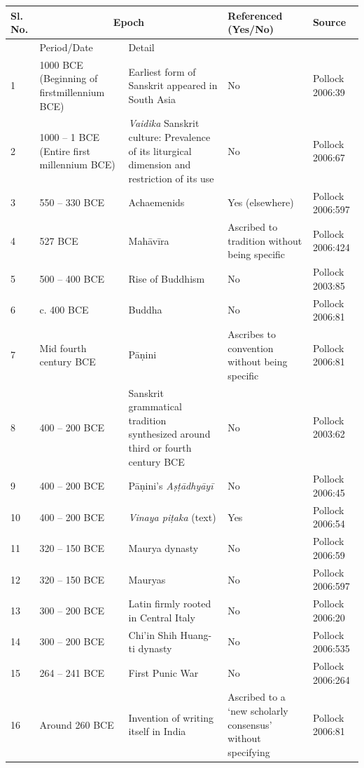 \begin{longtable}{|l|p{1.9cm}|p{1.9cm}|p{1.6cm}|p{1.6cm}|}
\hline
Sl. No. & \multicolumn{2}{c|}{Epoch} & Referenced (Yes/No) & Source \\
\hline
 & Period/Date & Detail &  &  \\
\hline
1 & 1000 BCE (Beginning of first\break millennium BCE) & Earliest form of Sanskrit appeared in South Asia & No & Pollock 2006:39 \\
\hline
2 & 1000 – 1 BCE (Entire first millennium BCE) & \textit{Vaidika} Sanskrit culture: Prevalence of its liturgical dimension and restriction of its use & No & Pollock 2006:67 \\
\hline
3 & 550 – 330 BCE & Achaemenids\index{Achaemenids} & Yes (elsewhere) & Pollock 2006:597 \\
\hline
4 & 527 BCE & Mahāvīra\index{Mahavira@Mahāvīra} & Ascribed to tradi\break tion without being specific & Pollock 2006:424 \\
\hline
5 & 500 – 400 BCE & Rise of Buddhism\index{Buddhism} & No & Pollock\index{Pollock, Sheldon} 2003:85 \\
\hline
6 & c. 400 BCE & Buddha\index{Buddha, the} & No & Pollock 2006:81 \\
\hline
7 & Mid fourth century BCE & Pāṇini\index{Panini@Pāṇini} & Ascribes to conven\break tion without being specific & Pollock 2006:81 \\
\hline
8 & 400 – 200 BCE & Sanskrit grammatical tradition synthesized around third or fourth century BCE & No & Pollock 2003:62 \\
\hline
9 & 400 – 200 BCE & Pāṇini’s \textit{Aṣṭādhyāyī}\index{Astadhyayi@\textit{Aṣṭādhyāyī}} & No & Pollock 2006:45 \\
\hline
10 & 400 – 200 BCE & \textit{Vinaya piṭaka} (text) & Yes & Pollock 2006:54 \\
\hline
11 & 320 – 150 BCE & Maurya dynasty & No & Pollock 2006:59 \\
\hline
12 & 320 – 150 BCE & Mauryas & No & Pollock 2006:597 \\
\hline
13 & 300 – 200 BCE & Latin firmly rooted in Central Italy & No & Pollock 2006:20 \\
\hline
14 & 300 – 200 BCE & Chi’in Shih Huang-ti dynasty & No & Pollock 2006:535 \\
\hline
15 & 264 – 241 BCE & First Punic War & No & Pollock 2006:264 \\
\hline
16 & Around 260 BCE & Invention of writing itself in India & Ascribed to a ‘new scholarly consensus’ without specifying & Pollock 2006:81 \\

\end{longtable}
